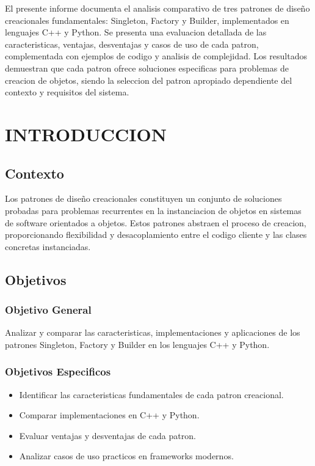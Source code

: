 \documentclass[11pt,a4paper]{article}
\begin{document}
El presente informe documenta el analisis comparativo de tres patrones de diseño creacionales fundamentales: Singleton, Factory y Builder, implementados en lenguajes C++ y Python. Se presenta una evaluacion detallada de las caracteristicas, ventajas, desventajas y casos de uso de cada patron, complementada con ejemplos de codigo y analisis de complejidad. Los resultados demuestran que cada patron ofrece soluciones especificas para problemas de creacion de objetos, siendo la seleccion del patron apropiado dependiente del contexto y requisitos del sistema.

\tableofcontents
\newpage

\section{INTRODUCCION}

\subsection{Contexto}

Los patrones de diseño creacionales constituyen un conjunto de soluciones probadas para problemas recurrentes en la instanciacion de objetos en sistemas de software orientados a objetos. Estos patrones abstraen el proceso de creacion, proporcionando flexibilidad y desacoplamiento entre el codigo cliente y las clases concretas instanciadas.

\subsection{Objetivos}

\subsubsection{Objetivo General}

Analizar y comparar las caracteristicas, implementaciones y aplicaciones de los patrones Singleton, Factory y Builder en los lenguajes C++ y Python.

\subsubsection{Objetivos Especificos}

\begin{itemize}
    \item Identificar las caracteristicas fundamentales de cada patron creacional.
    \item Comparar implementaciones en C++ y Python.
    \item Evaluar ventajas y desventajas de cada patron.
    \item Analizar casos de uso practicos en frameworks modernos.
\end{itemize}
\end{document}
